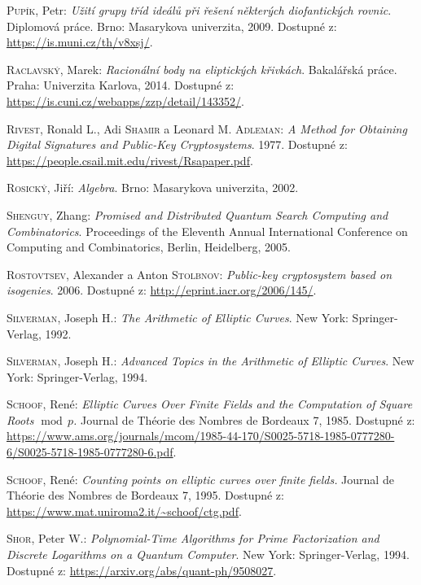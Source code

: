 \documentclass[12pt]{report}
\begin{document}
\begin{thebibliography}{97}
\textsc{Pupík}, Petr: \textit{Užití grupy tříd ideálů při řešení některých diofantických rovnic}. Diplomová práce. Brno: Masarykova univerzita, 2009. Dostupné z: \url{https://is.muni.cz/th/v8xsj/}.

\textsc{Raclavský}, Marek: \textit{Racionální body na eliptických křivkách}. Bakalářská práce. Praha: Univerzita Karlova, 2014. Dostupné z: \url{https://is.cuni.cz/webapps/zzp/detail/143352/}.

\textsc{Rivest}, Ronald L., Adi \textsc{Shamir} a Leonard M. \textsc{Adleman}: \textit{A Method for Obtaining Digital Signatures and Public-Key Cryptosystems}. 1977. Dostupné z: \url{https://people.csail.mit.edu/rivest/Rsapaper.pdf}. 

\textsc{Rosický}, Jiří: \textit{Algebra}. Brno: Masarykova univerzita, 2002.

\textsc{Shenguy}, Zhang: \textit{Promised and Distributed Quantum Search Computing and Combinatorics}. Proceedings of the Eleventh  Annual  International Conference on Computing  and Combinatorics, Berlin, Heidelberg, 2005.

\textsc{Rostovtsev}, Alexander a Anton \textsc{Stolbnov}:\textit{ Public-key cryptosystem based on isogenies}. 2006. Dostupné z: \url{http://eprint.iacr.org/2006/145/}. 

\textsc{Silverman}, Joseph H.: \textit{The Arithmetic of Elliptic Curves}. New York: Springer-Verlag, 1992. 

\textsc{Silverman}, Joseph H.: \textit{Advanced Topics in the Arithmetic of Elliptic Curves}. New York: Springer-Verlag, 1994. 


\textsc{Schoof}, René: \textit{Elliptic Curves Over Finite Fields and the Computation of Square Roots $\! \operatorname{mod} \, p$.} Journal de Théorie des Nombres de Bordeaux 7, 1985. Dostupné z: \url{https://www.ams.org/journals/mcom/1985-44-170/S0025-5718-1985-0777280-6/S0025-5718-1985-0777280-6.pdf}.

\textsc{Schoof}, René: \textit{Counting points on elliptic curves over finite fields.} Journal de Théorie des Nombres de Bordeaux 7, 1995. Dostupné z: \url{https://www.mat.uniroma2.it/~schoof/ctg.pdf}.

\textsc{Shor}, Peter W.: \textit{Polynomial-Time Algorithms for Prime Factorization and Discrete Logarithms on a Quantum Computer}. New York: Springer-Verlag, 1994. Dostupné z: \url{https://arxiv.org/abs/quant-ph/9508027}.


\end{thebibliography}
\end{document}

